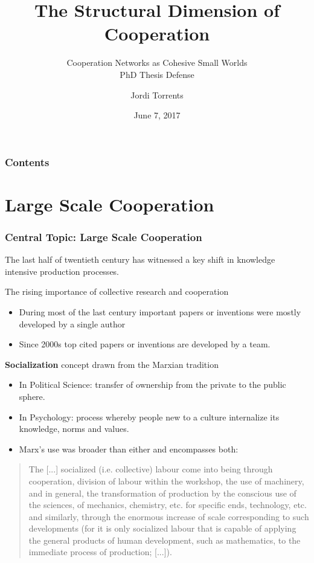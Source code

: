 \documentclass[ignorenonframetext,red,8pt,notes=hide]{beamer}
\title{The Structural Dimension of Cooperation}
\subtitle{Cooperation Networks as Cohesive Small Worlds\\PhD Thesis Defense}
\author{Jordi Torrents}
\institute{Department of Sociology\\University of Barcelona}
\date{June 7, 2017}
\begin{document}
\begin{frame}[label=portada]
\maketitle
\end{frame}

\begin{frame}[label=toc]
\frametitle{Contents}
\tableofcontents
\end{frame}

\section{Large Scale Cooperation}

\begin{frame}
\frametitle{Central Topic: Large Scale Cooperation}

The last half of twentieth century has witnessed a key shift in knowledge intensive production processes.

\begin{block}{The rising importance of collective research and cooperation \citep{uzzi:2007a}}
\begin{itemize}
\item During most of the last century important papers or inventions were mostly developed by a single author 
\item Since 2000s top cited papers or inventions are developed by a team.
\end{itemize}
\end{block}

\pause

\begin{block}{\textbf{Socialization} concept drawn from the Marxian tradition \citep{adler:2007}}
\begin{itemize}
\item In Political Science: transfer of ownership from the private to the public sphere.
\item In Psychology: process whereby people new to a culture internalize its knowledge, norms and values.
\item Marx's use was broader than either and encompasses both:
\end{itemize}
\begin{quote}
The [...] socialized (i.e. collective) labour come into being through cooperation, division of labour within the workshop, the use of machinery, and in general, the transformation of production by the conscious use of the sciences, of mechanics, chemistry, etc. for specific ends, technology, etc. and similarly, through the enormous increase of scale corresponding to such developments (for it is only socialized labour that is capable of applying the general products of human development, such as mathematics, to the immediate process of production; [...]). \citep[1024]{marx:1990}
\end{quote}
\end{block}

\end{frame}
\end{document}
